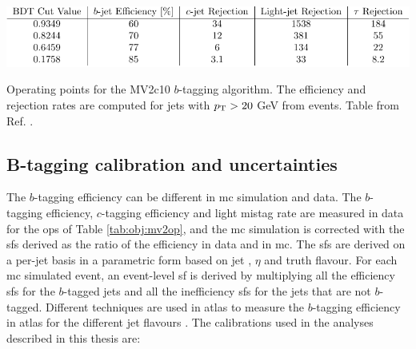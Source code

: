 \begin{table}[h]
\begin{center}
    \includegraphics[width=1.0\textwidth]{figures/objects/btag_op.pdf}  
\end{center}
 \caption{Operating points for the MV2c10 $b$-tagging algorithm. The efficiency and rejection rates are computed for jets with $p_{\rm T} > 20$ GeV from \ttbar events. Table from Ref. \cite{ATL-PHYS-PUB-2016-012}.}
  \label{tab:obj:mv2op}
\end{table}

\subsection{B-tagging calibration and uncertainties}
\label{sec:obj:btaggingcalib}

The $b$-tagging efficiency can be different in \gls{mc} simulation and data. The $b$-tagging efficiency, 
$c$-tagging efficiency and light mistag rate are measured in data for the \glspl{op} of Table \ref{tab:obj:mv2op}, 
and the \gls{mc} simulation is corrected with the \glspl{sf} derived as the ratio of the efficiency in data and in \gls{mc}. 
The \glspl{sf} are derived on a per-jet basis in a parametric form based on jet \pt, $\eta$ and truth flavour. 
For each \gls{mc} simulated event, an event-level \gls{sf} is derived by multiplying all the efficiency \glspl{sf} for the $b$-tagged jets 
and all the inefficiency \glspl{sf} for the jets that are not $b$-tagged. Different techniques are used in \gls{atlas} to measure the $b$-tagging 
efficiency in \gls{atlas} for the different jet flavours \cite{1748-0221-11-04-P04008}.
The calibrations used in the analyses described in this thesis are:

